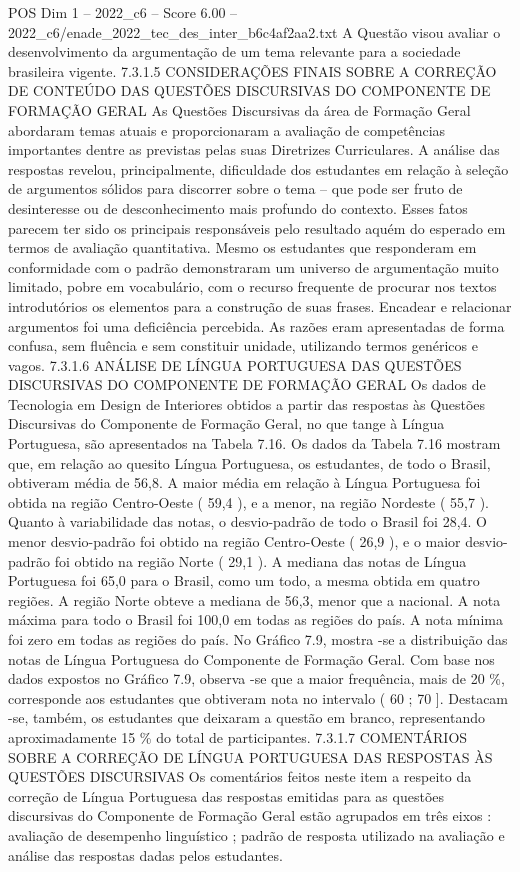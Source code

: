 \begin{textsample}{POS Dim 1 – 2022\_c6 – Score 6.00 – 2022\_c6/enade\_2022\_tec\_des\_inter\_b6c4af2aa2.txt}
A Questão visou avaliar o desenvolvimento da argumentação de um tema relevante para a sociedade brasileira vigente. 7.3.1.5 CONSIDERAÇÕES FINAIS SOBRE A CORREÇÃO DE CONTEÚDO DAS QUESTÕES DISCURSIVAS DO COMPONENTE DE FORMAÇÃO GERAL As Questões Discursivas da área de Formação Geral abordaram temas atuais e proporcionaram a avaliação de competências importantes dentre as previstas pelas suas Diretrizes Curriculares.
A análise das respostas revelou, principalmente, dificuldade dos estudantes em relação à seleção de argumentos sólidos para discorrer sobre o tema – que pode ser fruto de desinteresse ou de desconhecimento mais profundo do contexto.
Esses fatos parecem ter sido os principais responsáveis pelo resultado aquém do esperado em termos de avaliação quantitativa.
Mesmo os estudantes que responderam em conformidade com o padrão demonstraram um universo de argumentação muito limitado, pobre em vocabulário, com o recurso frequente de procurar nos textos introdutórios os elementos para a construção de suas frases.
Encadear e relacionar argumentos foi uma deficiência percebida.
As razões eram apresentadas de forma confusa, sem fluência e sem constituir unidade, utilizando termos genéricos e vagos. 7.3.1.6 ANÁLISE DE LÍNGUA PORTUGUESA DAS QUESTÕES DISCURSIVAS DO COMPONENTE DE FORMAÇÃO GERAL Os dados de Tecnologia em Design de Interiores obtidos a partir das respostas às Questões Discursivas do Componente de Formação Geral, no que tange à Língua Portuguesa, são apresentados na Tabela 7.16.
Os dados da Tabela 7.16 mostram que, em relação ao quesito Língua Portuguesa, os estudantes, de todo o Brasil, obtiveram média de 56,8.
A maior média em relação à Língua Portuguesa foi obtida na região Centro-Oeste ( 59,4 ), e a menor, na região Nordeste ( 55,7 ).
Quanto à variabilidade das notas, o desvio-padrão de todo o Brasil foi 28,4.
O menor desvio-padrão foi obtido na região Centro-Oeste ( 26,9 ), e o maior desvio-padrão foi obtido na região Norte ( 29,1 ).
A mediana das notas de Língua Portuguesa foi 65,0 para o Brasil, como um todo, a mesma obtida em quatro regiões.
A região Norte obteve a mediana de 56,3, menor que a nacional.
A nota máxima para todo o Brasil foi 100,0 em todas as regiões do país.
A nota mínima foi zero em todas as regiões do país.
No Gráfico 7.9, mostra -se a distribuição das notas de Língua Portuguesa do Componente de Formação Geral.
Com base nos dados expostos no Gráfico 7.9, observa -se que a maior frequência, mais de 20 \%, corresponde aos estudantes que obtiveram nota no intervalo ( 60 ; 70 ].
Destacam -se, também, os estudantes que deixaram a questão em branco, representando aproximadamente 15 \% do total de participantes. 7.3.1.7 COMENTÁRIOS SOBRE A CORREÇÃO DE LÍNGUA PORTUGUESA DAS RESPOSTAS ÀS QUESTÕES DISCURSIVAS Os comentários feitos neste item a respeito da correção de Língua Portuguesa das respostas emitidas para as questões discursivas do Componente de Formação Geral estão agrupados em três eixos : avaliação de desempenho linguístico ; padrão de resposta utilizado na avaliação e análise das respostas dadas pelos estudantes.

\end{textsample}
